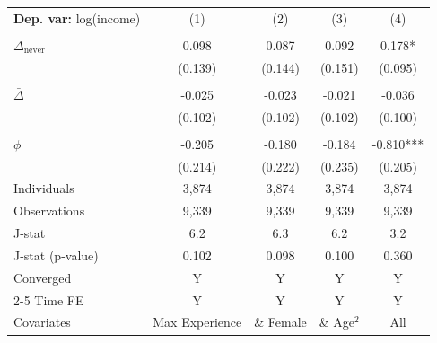 \begin{tabular}{l cccc} \toprule  \textbf{Dep. var:}  log(income) 
                    &\multicolumn{1}{c}{(1)}   &\multicolumn{1}{c}{(2)}   &\multicolumn{1}{c}{(3)}   &\multicolumn{1}{c}{(4)}   \\
                    &               &               &               &               \\
\addlinespace
$\Delta_{\text{never}}$&       0.098   &       0.087   &       0.092   &       0.178*  \\
                    &     (0.139)   &     (0.144)   &     (0.151)   &     (0.095)   \\
                    &               &               &               &               \\
\addlinespace
$\bar{\Delta}$      &      -0.025   &      -0.023   &      -0.021   &      -0.036   \\
                    &     (0.102)   &     (0.102)   &     (0.102)   &     (0.100)   \\
                    &               &               &               &               \\
\addlinespace
$\phi$              &      -0.205   &      -0.180   &      -0.184   &      -0.810***\\
                    &     (0.214)   &     (0.222)   &     (0.235)   &     (0.205)   \\
\addlinespace
Individuals         &       3,874   &       3,874   &       3,874   &       3,874   \\
Observations        &       9,339   &       9,339   &       9,339   &       9,339   \\
J-stat              &         6.2   &         6.3   &         6.2   &         3.2   \\
J-stat (p-value)    &       0.102   &       0.098   &       0.100   &       0.360   \\
Converged           &           Y   &           Y   &           Y   &           Y   \\
\cmidrule{2-5} Time FE & Y & Y & Y & Y \\ Covariates & Max Experience & \& Female & \& Age$^2$ & All \\ \bottomrule \end{tabular}
